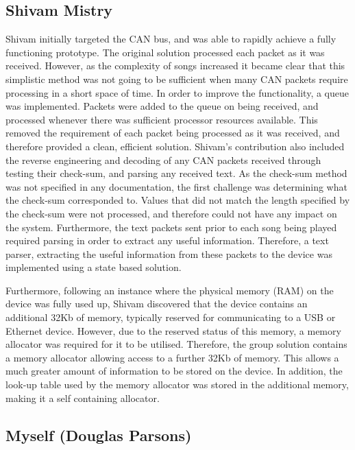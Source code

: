 \subsection*{Shivam Mistry}
Shivam initially targeted the CAN bus, and was able to rapidly achieve a fully 
functioning prototype. The original solution processed each packet as it was 
received. However, as the complexity of songs increased it became clear that this 
simplistic method was not going to be sufficient when many CAN packets require 
processing in a short space of time.
In order to improve the functionality, a queue was implemented. Packets were 
added to the queue on being received, and processed whenever there was sufficient
processor resources available.
This removed the requirement of each packet being processed as it was received,
 and therefore provided a clean, efficient solution.
Shivam's contribution also included the reverse engineering and decoding of any
 CAN packets received through testing their check-sum, and parsing any received 
text.
As the check-sum method was not specified in any documentation, the first 
challenge was determining what the check-sum corresponded to. Values that did 
not match the length specified by the check-sum were not processed, and therefore 
could not have any impact on the system. Furthermore, the text packets sent prior 
to each song being played required parsing in order to extract any useful 
information. Therefore, a text parser, extracting the useful information from 
these packets to the device was implemented using a state based solution. 
\par\bigskip\noindent
Furthermore, following an 
instance where the physical memory (RAM) on the device was fully used up, Shivam 
discovered that the device contains an additional 32Kb of memory, 
typically reserved for communicating to a USB or Ethernet device. However, 
due to the reserved status of this memory, a memory allocator was required for 
it to be utilised. 
Therefore, the group solution contains a memory allocator allowing access to 
a further 32Kb of memory. This allows a much greater amount of information to be 
stored on the device. 
In addition, the look-up table used by the memory allocator was stored in the 
additional memory, making it a self containing allocator. 

\subsection*{Myself (Douglas Parsons)}

